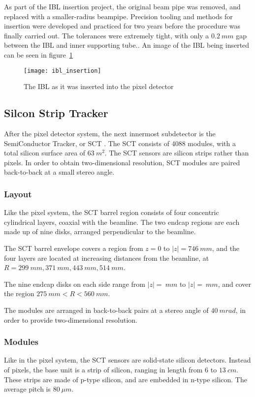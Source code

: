 As part of the IBL insertion project, the original beam pipe was removed, and replaced with a smaller-radius beampipe.
Precision tooling and methods for insertion were developed and practiced for two years before the procedure was finally carried out.
The tolerances were extremely tight, with only a $0.2~mm$ gap between the IBL and inner supporting tube.\cite{ibl-website}.
An image of the IBL being inserted can be seen in figure~\ref{fig:ibl_insertion}

\begin{figure}[h]
\texttt{[image: ibl\_insertion]}
\caption{The IBL as it was inserted into the pixel detector}
\label{fig:ibl_insertion}\cite{ibl-website}
\end{figure}

\subsection{Silcon Strip Tracker}\label{subsec:sct}

After the pixel detector system, the next innermost subdetector is the SemiConductor Tracker, or SCT .
The SCT consists of 4088 modules, with a total silicon surface area of $63~m^2$.\cite{atlas-detector-2008}
The SCT sensors are silicon strips rather than pixels.
In order to obtain two-dimensional resolution, SCT modules are paired back-to-back at a small stereo angle.

\subsubsection{Layout}
Like the pixel system, the SCT barrel region consists of four concentric cylindrical layers, coaxial with the beamline.
The two endcap regions are each made up of nine disks, arranged perpendicular to the beamline.

The SCT barrel envelope covers a region from $z = 0$ to $|z|  = 746~mm$,
and the four layers are located at increasing distances from the beamline,
at $R = 299~mm, 371~mm, 443~mm, 514~mm$.\cite{sct-barrel-2006}

The nine endcap disks on each side range from $|z| = ~mm$ to $|z| = ~mm$,
and cover the region $275~mm < R < 560~mm$.\cite{atlas-detector-2008}

The modules are arranged in back-to-back pairs at a stereo angle of $40~mrad$, in order to provide two-dimensional resolution.

\subsubsection{Modules}
Like in the pixel system, the SCT sensors are solid-state silicon detectors.
Instead of pixels, the base unit is a strip of silicon, ranging in length from $6$ to $13~cm$.
These strips are made of p-type silicon, and are embedded in n-type silicon. The average pitch is $80~\mu m$.\cite{sct-2010}

